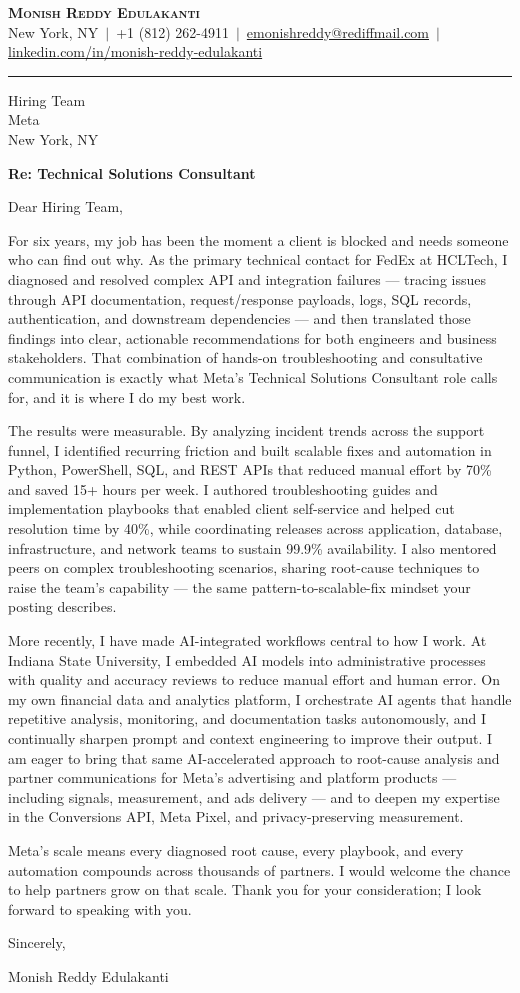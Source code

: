 \documentclass[letterpaper,11pt]{article}
\begin{document}
\begin{center}
    {\LARGE \scshape \textbf{Monish Reddy Edulakanti}} \\ \vspace{3pt}
    \small New York, NY \,$|$\, +1 (812) 262-4911 \,$|$\,
    \href{mailto:emonishreddy@rediffmail.com}{emonishreddy@rediffmail.com} \,$|$\,
    \href{https://linkedin.com/in/monish-reddy-edulakanti}{linkedin.com/in/monish-reddy-edulakanti}
\end{center}

\vspace{6pt}
\hrule
\vspace{14pt}

Hiring Team \\
Meta \\
New York, NY

\textbf{Re: Technical Solutions Consultant}

Dear Hiring Team,

For six years, my job has been the moment a client is blocked and needs someone who can find out why. As the primary technical contact for FedEx at HCLTech, I diagnosed and resolved complex API and integration failures --- tracing issues through API documentation, request/response payloads, logs, SQL records, authentication, and downstream dependencies --- and then translated those findings into clear, actionable recommendations for both engineers and business stakeholders. That combination of hands-on troubleshooting and consultative communication is exactly what Meta's Technical Solutions Consultant role calls for, and it is where I do my best work.

The results were measurable. By analyzing incident trends across the support funnel, I identified recurring friction and built scalable fixes and automation in Python, PowerShell, SQL, and REST APIs that reduced manual effort by 70\% and saved 15+ hours per week. I authored troubleshooting guides and implementation playbooks that enabled client self-service and helped cut resolution time by 40\%, while coordinating releases across application, database, infrastructure, and network teams to sustain 99.9\% availability. I also mentored peers on complex troubleshooting scenarios, sharing root-cause techniques to raise the team's capability --- the same pattern-to-scalable-fix mindset your posting describes.

More recently, I have made AI-integrated workflows central to how I work. At Indiana State University, I embedded AI models into administrative processes with quality and accuracy reviews to reduce manual effort and human error. On my own financial data and analytics platform, I orchestrate AI agents that handle repetitive analysis, monitoring, and documentation tasks autonomously, and I continually sharpen prompt and context engineering to improve their output. I am eager to bring that same AI-accelerated approach to root-cause analysis and partner communications for Meta's advertising and platform products --- including signals, measurement, and ads delivery --- and to deepen my expertise in the Conversions API, Meta Pixel, and privacy-preserving measurement.

Meta's scale means every diagnosed root cause, every playbook, and every automation compounds across thousands of partners. I would welcome the chance to help partners grow on that scale. Thank you for your consideration; I look forward to speaking with you.

Sincerely,

Monish Reddy Edulakanti
\end{document}
